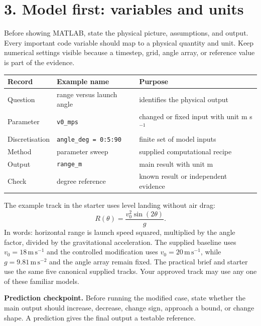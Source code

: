 \documentclass[11pt,a4paper]{article}
\newcommand{\units}[1]{\,\mathrm{#1}}
\begin{document}
\section*{3. Model first: variables and units}
Before showing MATLAB, state the physical picture, assumptions, and output. Every important code variable should map to a physical quantity and unit. Keep numerical settings visible because a timestep, grid, angle array, or reference value is part of the evidence.
\begin{center}\small
\begin{tabular}{>{\raggedright\arraybackslash}p{.24\linewidth}>{\raggedright\arraybackslash}p{.28\linewidth}>{\raggedright\arraybackslash}p{.36\linewidth}}
\toprule
\textbf{Record} & \textbf{Example name} & \textbf{Purpose}\\ \midrule
Question & range versus launch angle & identifies the physical output\\
Parameter & \texttt{v0\_mps} & changed or fixed input with unit m s$^{-1}$\\
Discretisation & \texttt{angle\_deg = 0:5:90} & finite set of model inputs\\
Method & parameter sweep & supplied computational recipe\\
Output & \texttt{range\_m} & main result with unit m\\
Check & 45 degree reference & known result or independent evidence\\
\bottomrule
\end{tabular}
\end{center}
The example track in the starter uses level landing without air drag:
\[
R(\theta)=\frac{v_0^2\sin(2\theta)}{g}.
\]
In words: horizontal range is launch speed squared, multiplied by the angle factor, divided by the gravitational acceleration. The supplied baseline uses $v_0=18\units{m\,s^{-1}}$ and the controlled modification uses $v_0=20\units{m\,s^{-1}}$, while $g=9.81\units{m\,s^{-2}}$ and the angle array remain fixed. The practical brief and starter use the same five canonical supplied tracks. Your approved track may use any one of these familiar models.
\begin{checkbox}\textbf{Prediction checkpoint.} Before running the modified case, state whether the main output should increase, decrease, change sign, approach a bound, or change shape. A prediction gives the final output a testable reference.\end{checkbox}
\end{document}
